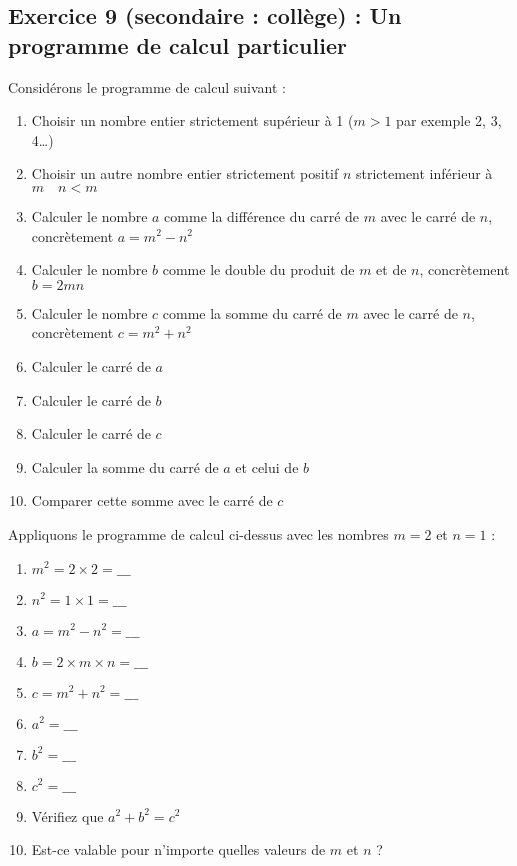 \subsection{Exercice 9 (secondaire : collège) : Un programme de calcul particulier}

\label{calc:niveau9}

Considérons le programme de calcul suivant :

\begin{enumerate}[label=P\arabic*)]
	\item Choisir un nombre entier strictement supérieur à 1 (\(m > 1\) par exemple 2, 3, 4\dots ) 
	\item Choisir un autre nombre entier strictement positif \(n\) strictement inférieur à \(m\quad n < m\)
	\item Calculer le nombre \(a\) comme la différence du carré de \(m\) avec le carré de \(n\), concrètement \(a = m^2 - n^2\)
	\item Calculer le nombre \(b\) comme le double du produit de \(m\) et de \(n\), concrètement \(b = 2mn\)
	\item Calculer le nombre \(c\) comme la somme du carré de \(m\) avec le carré de \(n\), concrètement \(c = m^2 + n^2\)
	\item Calculer le carré de \(a\)
	\item Calculer le carré de \(b\)
	\item Calculer le carré de \(c\)
	\item Calculer la somme du carré de \(a\) et celui de \(b\)
	\item Comparer cette somme avec le carré de \(c\)
\end{enumerate}

\newpage

Appliquons le programme de calcul ci-dessus avec les nombres \(m = 2\) et \(n = 1\) : 

\begin{enumerate}[label=C\arabic*)]
    \item \(m^2 = 2 \times 2 =  \_\_\_\)
    \item \(n^2 = 1 \times 1 = \_\_\_\)
    \item \(a = m^2 - n^2 = \_\_\_\)
    \item \(b = 2 \times m \times n = \_\_\_\)
    \item \(c = m^2 + n^2 = \_\_\_\)
    \item \(a^2 =  \_\_\_\)
    \item \(b^2 =  \_\_\_\)
    \item \(c^2 =  \_\_\_\)
    \item Vérifiez que \( a^2 + b^2 = c^2 \)
    \item Est-ce valable pour n'importe quelles valeurs de \(m\) et \(n\) ?
\end{enumerate}
